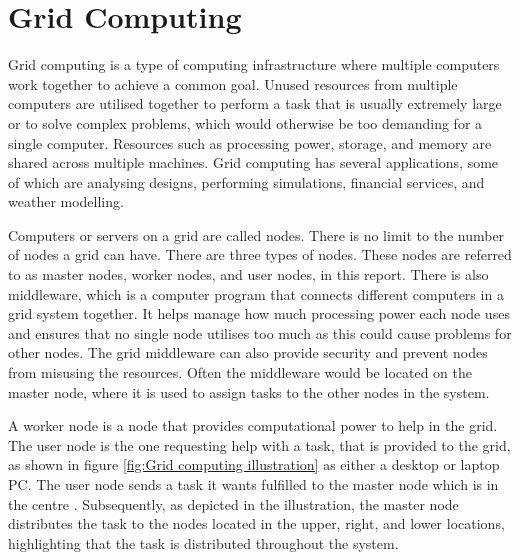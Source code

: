 \section{Grid Computing}
Grid computing is a type of computing infrastructure where multiple computers work together to achieve a common goal. Unused resources from multiple computers are utilised together to perform a task that is usually extremely large or to solve complex problems, which would otherwise be too demanding for a single computer. Resources such as processing power, storage, and memory are shared across multiple machines. Grid computing has several applications, some of which are analysing designs, performing simulations, financial services, and weather modelling.\cite{AWS_grid_computing}

Computers or servers on a grid are called nodes. There is no limit to the number of nodes a grid can have. There are three types of nodes. These nodes are referred to as master nodes, worker nodes, and user nodes, in this report. There is also middleware, which is a computer program that connects different computers in a grid system together. It helps manage how much processing power each node uses and ensures that no single node utilises too much as this could cause problems for other nodes. The grid middleware can also provide security and prevent nodes from misusing the resources. Often the middleware would be located on the master node, where it is used to assign tasks to the other nodes in the system. 

A worker node is a node that provides computational power to help in the grid. The user node is the one requesting help with a task, that is provided to the grid, as shown in figure \ref{fig:Grid computing illustration} as either a desktop or laptop PC. The user node sends a task it wants fulfilled to the master node which is in the centre \cite{AWS_grid_computing}. Subsequently, as depicted in the illustration, the master node distributes the task to the nodes located in the upper, right, and lower locations, highlighting that the task is distributed throughout the system. 

